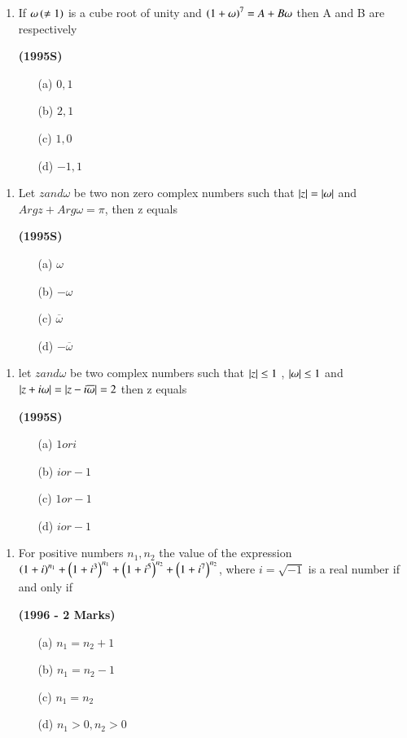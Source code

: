 \documentclass[journal,12pt,twocolumn]{IEEEtran}
\theoremstyle{remark}
\begin{document}
\begin{enumerate}[start=9]
\item If $\omega\left(\neq1\right)$ is a cube root of unity and $\left(1+\omega\right)^7=A+B\omega$ then A and B are respectively

\hfill{\textbf{(1995S)}}

\begin{enumerate}
\item[(a)]$0,1$
\item[(b)]$2,1$
\item[(c)]$1,0$
\item[(d)]$-1,1$
\end{enumerate}
\end{enumerate}
\begin{enumerate}[start=10]
\item Let $z and \omega$ be two non zero complex numbers such that $\left\vert z\right\vert=\left\vert\omega\right\vert$ and $Argz+Arg\omega=\pi$, then z equals 

\hfill{\textbf{(1995S)}}

\begin{enumerate}
\item[(a)]$\omega$
\item[(b)]$-\omega$
\item[(c)]$\overline{\omega}$
\item[(d)]$-\overline{\omega}$
\end{enumerate}
\end{enumerate}
\begin{enumerate}[start=11]
\item let $z and\omega$ be two complex numbers such that $\left\vert z\right\vert\leq1$ , $\left\vert\omega\right\vert\leq1$ and $\left\vert z+i\omega\right\vert=\left\vert z-i\overline{\omega}\right\vert=2$ then z equals 

\hfill{\textbf{(1995S)}}

\begin{enumerate}
\item[(a)]$1 or i$
\item[(b)]$i or -1$
\item[(c)]$1 or -1$
\item[(d)]$i or -1$
\end{enumerate}
\end{enumerate}
\begin{enumerate}[start=12]
\item For positive numbers $n_1,n_2$ the value of the expression $\left(1+i\right)^{n_1}+\left(1+i^3\right)^{n_1}+\left(1+i^5\right)^{n_2}+\left(1+i^7\right)^{n_2}$, where $i=\sqrt{-1}$ is a real number if and only if

\hfill{\textbf{(1996 - 2 Marks)}}

\begin{enumerate}
\item[(a)]$n_1=n_2+1$
\item[(b)]$n_1=n_2-1$
\item[(c)]$n_1=n_2$
\item[(d)]$n_1>0,n_2>0$
\end{enumerate}
\end{enumerate}
\end{document}
